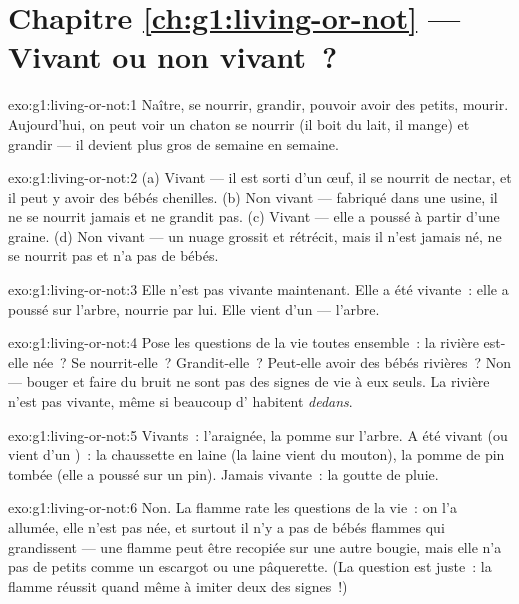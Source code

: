 \section*{Chapitre \ref{ch:g1:living-or-not} --- Vivant ou non vivant~?}

\begin{solution}{exo:g1:living-or-not:1}
Naître, se nourrir, grandir, pouvoir avoir des petits, mourir.
Aujourd'hui, on peut voir un chaton se nourrir (il boit du lait, il
mange) et grandir --- il devient plus gros de semaine en semaine.
\end{solution}

\begin{solution}{exo:g1:living-or-not:2}
(a) Vivant --- il est sorti d'un œuf, il se nourrit de nectar, et il
peut y avoir des bébés chenilles. (b) Non vivant --- fabriqué dans
une usine, il ne se nourrit jamais et ne grandit pas. (c) Vivant ---
elle a poussé à partir d'une graine. (d) Non vivant --- un nuage
grossit et rétrécit, mais il n'est jamais né, ne se nourrit pas et
n'a pas de bébés.
\end{solution}

\begin{solution}{exo:g1:living-or-not:3}
Elle n'est pas vivante maintenant. Elle a été vivante~: elle a
poussé sur l'arbre, nourrie par lui. Elle vient d'un  ---
l'arbre.
\end{solution}

\begin{solution}{exo:g1:living-or-not:4}
Pose les questions de la vie toutes ensemble~: la rivière est-elle
née~? Se nourrit-elle~? Grandit-elle~? Peut-elle avoir des bébés
rivières~? Non --- bouger et faire du bruit ne sont pas des signes de
vie à eux seuls. La rivière n'est pas vivante, même si beaucoup
d' habitent \emph{dedans}.
\end{solution}

\begin{solution}{exo:g1:living-or-not:5}
Vivants~: l'araignée, la pomme sur l'arbre. A été vivant (ou vient
d'un )~: la chaussette en laine (la laine vient du
mouton), la pomme de pin tombée (elle a poussé sur un pin). Jamais
vivante~: la goutte de pluie.
\end{solution}

\begin{solution}{exo:g1:living-or-not:6}
Non. La flamme rate les questions de la vie~: on l'a allumée, elle
n'est pas née, et surtout il n'y a pas de bébés flammes qui
grandissent --- une flamme peut être recopiée sur une autre bougie,
mais elle n'a pas de petits comme un escargot ou une pâquerette.
(La question est juste~: la flamme réussit quand même à imiter deux
des signes~!)
\end{solution}

